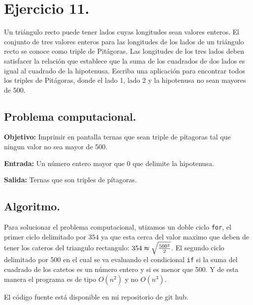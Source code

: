 \documentclass[12pt,letterpaper]{article}
\begin{document}
\section{Ejercicio 11.}

Un tri\'angulo recto puede tener lados cuyas longitudes sean valores enteros. El conjunto de tres valores enteros para las longitudes de los lados de un tri\'angulo recto se conoce como triple de Pit\'agoras. 
Las longitudes de los tres lados deben satisfacer la relaci\'on que establece que la suma de los cuadrados de dos lados es igual al cuadrado de la hipotenusa.
Escriba una aplicaci\'on para encontrar todos los triples de Pit\'agoras, donde el lado 1, lado 2 y la hipotenusa no sean mayores de 500.

\subsection{Problema computacional.}
\textbf{Objetivo:} Imprimir en pantalla ternas que sean triple de p\'itagoras tal que ningun valor no sea mayor de 500.

\textbf{Entrada:} Un n\'umero entero mayor que 0 que delimite la hipotenusa.

\textbf{Salida:} Ternas que son triples de p\'itagoras.

\subsection{Algoritmo.}
Para solucionar el problema computacional, utizamos un doble ciclo \texttt{for}, el primer ciclo delimitado por $354$ ya que esta cerca del valor maximo que deben de tener los cateros del triangulo rectangulo:
$354 \thickapprox \sqrt{\frac{500^2}{2}}  $. El segundo ciclo delimitado por 500 en el cual se va evaluando el condicional \texttt{if} si la suma del cuadrado de los catetos es un n\'umero entero y si es menor que 500. Y de esta manera el programa es de tipo $O(n^2)$ y no $O(n^3)$.


El código fuente está disponible en mi repositorio de git hub. \cite{url:triple_de_pitagoras}
\end{document}
